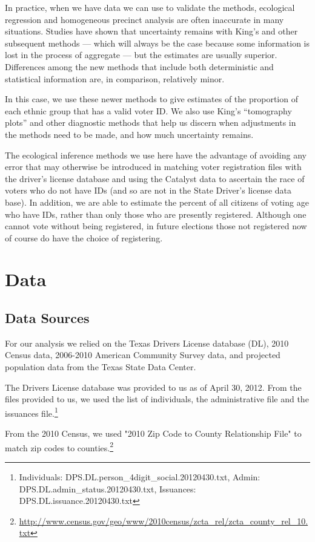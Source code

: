 \documentclass[12pt]{article}
\begin{document}
In practice, when we have data we can use to validate the methods,
ecological regression and homogeneous precinct analysis are often
inaccurate in many situations. Studies have shown that uncertainty
remains with King's and other subsequent methods --- which will always
be the case because some information is lost in the process of
aggregate --- but the estimates are usually superior. Differences
among the new methods that include both deterministic and statistical
information are, in comparison, relatively minor.

In this case, we use these newer methods to give estimates of the
proportion of each ethnic group that has a valid voter ID.  We also
use King's ``tomography plots'' and other diagnostic methods that help
us discern when adjustments in the methods need to be made, and how
much uncertainty remains.

The ecological inference methods we use here have the advantage of
avoiding any error that may otherwise be introduced in matching voter
registration files with the driver's license database and using the
Catalyst data to ascertain the race of voters who do not have IDs (and
so are not in the State Driver's license data base).  In addition, we
are able to estimate the percent of all citizens of voting age who
have IDs, rather than only those who are presently registered.
Although one cannot vote without being registered, in future elections
those not registered now of course do have the choice of registering.

\section{Data}\label{s:data}
\subsection{Data Sources}
For our analysis we relied on the Texas Drivers License database (DL), 2010 Census data, 2006-2010 American Community Survey data, and projected population data from the Texas State Data Center.

The Drivers License database was provided to us as of April 30, 2012.  From the files provided to us, we used the list of individuals, the administrative file and the issuances file.\footnote{Individuals: DPS.DL.person\_4digit\_social.20120430.txt, Admin: DPS.DL.admin\_status.20120430.txt, Issuances: DPS.DL.issuance.20120430.txt}

From the 2010 Census, we used "2010 Zip Code to County Relationship File" to match zip codes to counties.\footnote{\url{http://www.census.gov/geo/www/2010census/zcta_rel/zcta_county_rel_10.txt}}
\end{document}
